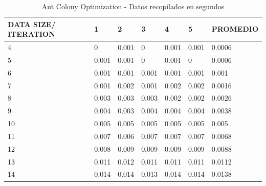 \documentclass[12pt]{article}
\begin{document}
\begin{appendices}
\begin{table}[!ht]
    \centering
    \caption{Ant Colony Optimization - Datos recopilados en segundos}
    \begin{tabular}{|l|l|l|l|l|l|l|}
    \hline
        DATA SIZE/ ITERATION & 1 & 2 & 3 & 4 & 5 & PROMEDIO \\ \hline
        4 & 0 & 0.001 & 0 & 0.001 & 0.001 & 0.0006 \\ \hline
        5 & 0.001 & 0.001 & 0 & 0.001 & 0 & 0.0006 \\ \hline
        6 & 0.001 & 0.001 & 0.001 & 0.001 & 0.001 & 0.001 \\ \hline
        7 & 0.001 & 0.002 & 0.001 & 0.002 & 0.002 & 0.0016 \\ \hline
        8 & 0.003 & 0.003 & 0.003 & 0.002 & 0.002 & 0.0026 \\ \hline
        9 & 0.004 & 0.003 & 0.004 & 0.004 & 0.004 & 0.0038 \\ \hline
        10 & 0.005 & 0.005 & 0.005 & 0.005 & 0.005 & 0.005 \\ \hline
        11 & 0.007 & 0.006 & 0.007 & 0.007 & 0.007 & 0.0068 \\ \hline
        12 & 0.008 & 0.009 & 0.009 & 0.009 & 0.009 & 0.0088 \\ \hline
        13 & 0.011 & 0.012 & 0.011 & 0.011 & 0.011 & 0.0112 \\ \hline
        14 & 0.014 & 0.014 & 0.013 & 0.014 & 0.014 & 0.0138 \\ \hline
    \end{tabular}
\end{table}

\end{appendices}
\end{document}

